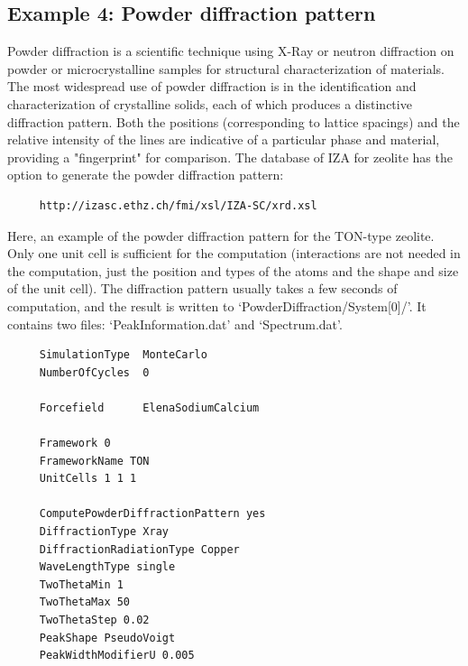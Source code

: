 \subsection*{Example 4: Powder diffraction pattern}

Powder diffraction is a scientific technique using X-Ray or neutron diffraction on powder or microcrystalline samples
for structural characterization of materials.
The most widespread use of powder diffraction is in the identification and characterization of crystalline solids,
each of which produces a distinctive diffraction pattern. Both the positions (corresponding to lattice spacings) and
the relative intensity of the lines are indicative of a particular phase and material, providing a "fingerprint" for comparison.
The database of IZA for zeolite has the option to generate the powder diffraction pattern:
\begin{tiny}
\begin{verbatim}
     http://izasc.ethz.ch/fmi/xsl/IZA-SC/xrd.xsl
\end{verbatim}
\end{tiny}

Here, an example of the powder diffraction pattern for the TON-type zeolite. Only one unit cell is sufficient for the computation
(interactions are not needed in the computation, just the position and types of the atoms and the shape and size of the unit cell).
The diffraction pattern usually takes a few seconds of computation, and the result is written to `PowderDiffraction/System[0]/'. It contains
two files: `PeakInformation.dat' and `Spectrum.dat'.
\begin{tiny}
\begin{verbatim}
     SimulationType  MonteCarlo
     NumberOfCycles  0

     Forcefield      ElenaSodiumCalcium

     Framework 0
     FrameworkName TON
     UnitCells 1 1 1

     ComputePowderDiffractionPattern yes
     DiffractionType Xray
     DiffractionRadiationType Copper
     WaveLengthType single
     TwoThetaMin 1
     TwoThetaMax 50
     TwoThetaStep 0.02
     PeakShape PseudoVoigt
     PeakWidthModifierU 0.005
\end{verbatim}
\end{tiny}

